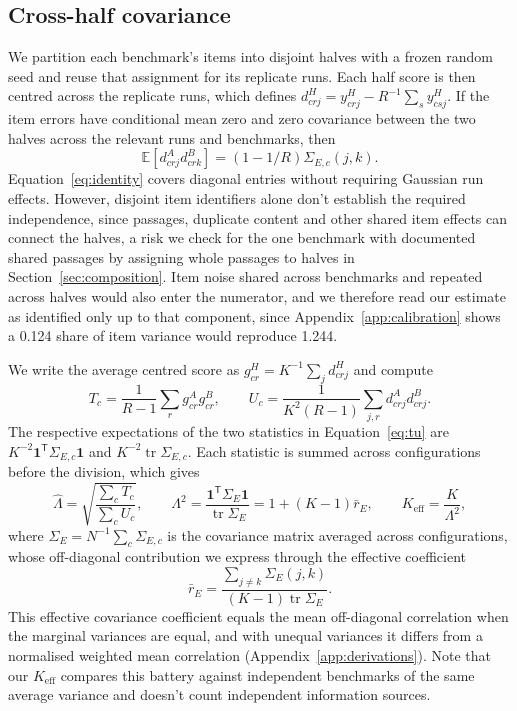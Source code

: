 \documentclass{article}
\newcommand{\Lam}{\Lambda}
\newcommand{\Sig}{\Sigma_E}
\begin{document}
\subsection{Cross-half covariance}
We partition each benchmark's items into disjoint halves with a frozen random seed and reuse that assignment for its replicate runs. Each half score is then centred across the replicate runs, which defines $d^H_{crj}=y^H_{crj}-R^{-1}\sum_s y^H_{csj}$. If the item errors have conditional mean zero and zero covariance between the two halves across the relevant runs and benchmarks, then
\begin{equation}
\mathbb{E}[d^A_{crj}d^B_{crk}]=(1-1/R)\Sigma_{E,c}(j,k).
\label{eq:identity}
\end{equation}
Equation~\ref{eq:identity} covers diagonal entries without requiring Gaussian run effects. However, disjoint item identifiers alone don't establish the required independence, since passages, duplicate content and other shared item effects can connect the halves, a risk we check for the one benchmark with documented shared passages by assigning whole passages to halves in Section~\ref{sec:composition}. Item noise shared across benchmarks and repeated across halves would also enter the numerator, and we therefore read our estimate as identified only up to that component, since Appendix~\ref{app:calibration} shows a 0.124 share of item variance would reproduce 1.244.

We write the average centred score as $g^H_{cr}=K^{-1}\sum_j d^H_{crj}$ and compute
\begin{equation}
T_c=\frac{1}{R-1}\sum_r g^A_{cr}g^B_{cr},\qquad
U_c=\frac{1}{K^2(R-1)}\sum_{j,r}d^A_{crj}d^B_{crj}.
\label{eq:tu}
\end{equation}
The respective expectations of the two statistics in Equation~\ref{eq:tu} are $K^{-2}\mathbf{1}^{\mathsf T}\Sigma_{E,c}\mathbf{1}$ and $K^{-2}\operatorname{tr}\Sigma_{E,c}$. Each statistic is summed across configurations before the division, which gives
\begin{equation}
\widehat\Lam=\sqrt{\frac{\sum_c T_c}{\sum_c U_c}},\qquad
\Lam^2=\frac{\mathbf{1}^{\mathsf T}\Sig\mathbf{1}}{\operatorname{tr}\Sig}
=1+(K-1)\bar r_E,\qquad K_{\mathrm{eff}}=\frac{K}{\Lam^2},
\label{eq:lambda}
\end{equation}
where $\Sig=N^{-1}\sum_c\Sigma_{E,c}$ is the covariance matrix averaged across configurations, whose off-diagonal contribution we express through the effective coefficient
\begin{equation}
\bar r_E=\frac{\sum_{j\ne k}\Sigma_E(j,k)}{(K-1)\operatorname{tr}\Sig}.
\label{eq:effective}
\end{equation}
This effective covariance coefficient equals the mean off-diagonal correlation when the marginal variances are equal, and with unequal variances it differs from a normalised weighted mean correlation (Appendix~\ref{app:derivations}). Note that our $K_{\mathrm{eff}}$ compares this battery against independent benchmarks of the same average variance and doesn't count independent information sources.
\end{document}
